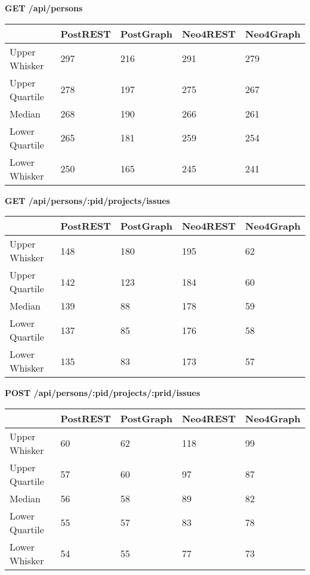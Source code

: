 \noindent
\textbf{GET /api/persons}
\begin{table}[H]
\begin{tabular}{|l|l|l|l|l|}
\hline
               & PostREST & PostGraph & Neo4REST & Neo4Graph \\ \hline
Upper Whisker  & 297      & 216       & 291      & 279       \\ \hline
Upper Quartile & 278      & 197       & 275      & 267       \\ \hline
Median         & 268      & 190       & 266      & 261       \\ \hline
Lower Quartile & 265      & 181       & 259      & 254       \\ \hline
Lower Whisker  & 250      & 165       & 245      & 241       \\ \hline
\end{tabular}
\end{table}
\noindent
\textbf{GET /api/persons/:pid/projects/issues}
\begin{table}[H]
\begin{tabular}{|l|l|l|l|l|}
\hline
               & PostREST & PostGraph & Neo4REST & Neo4Graph \\ \hline
Upper Whisker  & 148      & 180       & 195      & 62        \\ \hline
Upper Quartile & 142      & 123       & 184      & 60        \\ \hline
Median         & 139      & 88        & 178      & 59        \\ \hline
Lower Quartile & 137      & 85        & 176      & 58        \\ \hline
Lower Whisker  & 135      & 83        & 173      & 57        \\ \hline
\end{tabular}
\end{table}
\newpage
\noindent
\textbf{POST /api/persons/:pid/projects/:prid/issues}
\begin{table}[H]
\begin{tabular}{|l|l|l|l|l|}
\hline
               & PostREST & PostGraph & Neo4REST & Neo4Graph \\ \hline
Upper Whisker  & 60       & 62        & 118      & 99        \\ \hline
Upper Quartile & 57       & 60        & 97       & 87        \\ \hline
Median         & 56       & 58        & 89       & 82        \\ \hline
Lower Quartile & 55       & 57        & 83       & 78        \\ \hline
Lower Whisker  & 54       & 55        & 77       & 73        \\ \hline
\end{tabular}
\end{table}
\noindent
